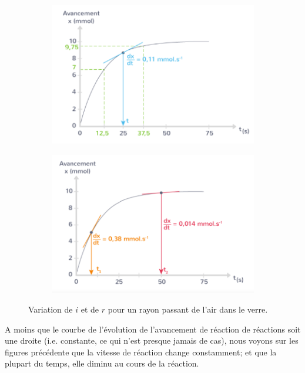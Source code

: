 \documentclass[11pt,a4paper]{article}
\begin{document}
\begin{figure}[ht]
\centering
\begin{subfigure}{.45\textwidth}
  \centering
  \includegraphics[width=.95\linewidth]{imgs/c4/tangente1.png}  
\end{subfigure}
\begin{subfigure}{.45\textwidth}
  \centering
  \includegraphics[width=.95\linewidth]{imgs/c4/tangente2.png}  
\end{subfigure}
\caption{Variation de $i$ et de $r$ pour un rayon passant de l'air dans le verre.}
\end{figure}

\begin{rmrq}
A moins que le courbe de l'évolution de l'avancement de réaction de réactions soit une droite (i.e. constante, ce qui n'est presque jamais de cas), nous voyons sur les figures précédente que la vitesse de réaction change constamment; et que la plupart du temps, elle diminu au cours de la réaction.   
\end{rmrq}
\end{document}
